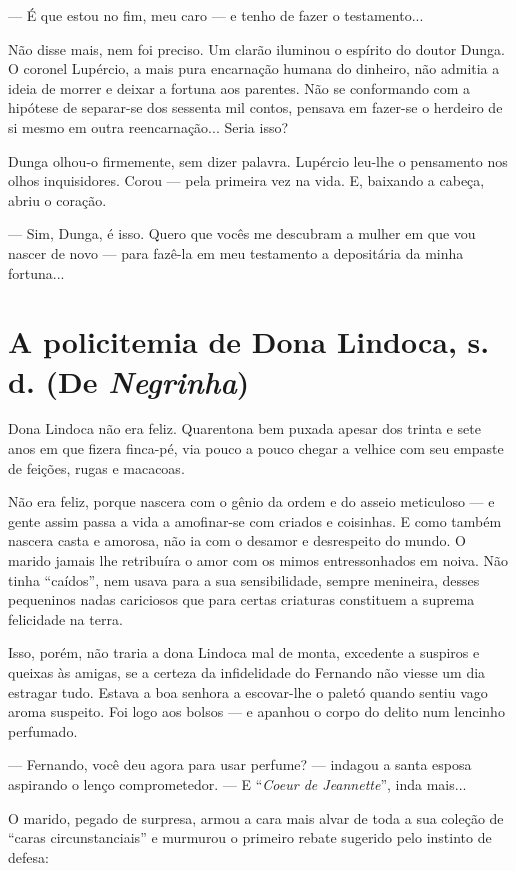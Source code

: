 --- É que estou no fim, meu caro --- e tenho de fazer o testamento...

Não disse mais, nem foi preciso. Um clarão iluminou o espírito do doutor
Dunga. O coronel Lupércio, a mais pura encarnação humana do dinheiro,
não admitia a ideia de morrer e deixar a fortuna aos parentes. Não se
conformando com a hipótese de separar-se dos sessenta mil contos,
pensava em fazer-se o herdeiro de si mesmo em outra reencarnação...
Seria isso?

Dunga olhou-o firmemente, sem dizer palavra. Lupércio leu-lhe o
pensamento nos olhos inquisidores. Corou --- pela primeira vez na vida.
E, baixando a cabeça, abriu o coração.

--- Sim, Dunga, é isso. Quero que vocês me descubram a mulher em que vou
nascer de novo --- para fazê-la em meu testamento a depositária da minha
fortuna...

\chapter{A policitemia de Dona Lindoca, s. d. (De \emph{Negrinha})}

Dona Lindoca não era feliz. Quarentona bem puxada apesar dos trinta e
sete anos em que fizera finca-pé, via pouco a pouco chegar a velhice com
seu empaste de feições, rugas e macacoas.

Não era feliz, porque nascera com o gênio da ordem e do asseio
meticuloso --- e gente assim passa a vida a amofinar-se com criados e
coisinhas. E como também nascera casta e amorosa, não ia com o desamor e
desrespeito do mundo. O marido jamais lhe retribuíra o amor com os mimos
entressonhados em noiva. Não tinha ``caídos'', nem usava para a sua
sensibilidade, sempre menineira, desses pequeninos nadas cariciosos que
para certas criaturas constituem a suprema felicidade na terra.

Isso, porém, não traria a dona Lindoca mal de monta, excedente a
suspiros e queixas às amigas, se a certeza da infidelidade do Fernando
não viesse um dia estragar tudo. Estava a boa senhora a escovar-lhe o
paletó quando sentiu vago aroma suspeito. Foi logo aos bolsos --- e
apanhou o corpo do delito num lencinho perfumado.

--- Fernando, você deu agora para usar perfume? --- indagou a santa
esposa aspirando o lenço comprometedor. --- E ``\emph{Coeur de
Jeannette}'', inda mais...

O marido, pegado de surpresa, armou a cara mais alvar de toda a sua
coleção de ``caras circunstanciais'' e murmurou o primeiro rebate
sugerido pelo instinto de defesa:

